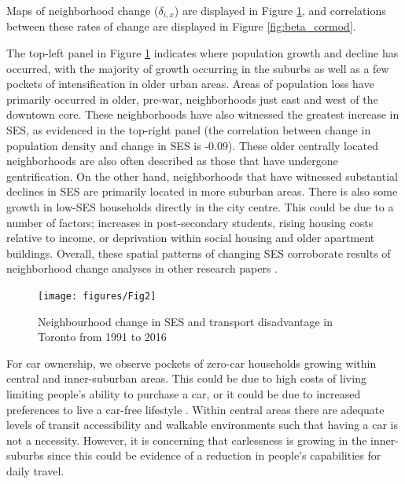 Maps of neighborhood change ($\delta_{i,x}$) are displayed in Figure \ref{fig:change_maps}, and correlations between these rates of change are displayed in Figure \ref{fig:beta_cormod}. 

The top-left panel in Figure \ref{fig:change_maps} indicates where population growth and decline has occurred, with the majority of growth occurring in the suburbs as well as a few pockets of intensification in older urban areas. Areas of population loss have primarily occurred in older, pre-war, neighborhoods just east and west of the downtown core. These neighborhoods have also witnessed the greatest increase in SES, as evidenced in the top-right panel (the correlation between change in population density and change in SES is -0.09). These older centrally located neighborhoods are also often described as those that have undergone gentrification. On the other hand, neighborhoods that have witnessed substantial declines in SES are primarily located in more suburban areas. There is also some growth in low-SES households directly in the city centre. This could be due to a number of factors; increases in post-secondary students, rising housing costs relative to income, or deprivation within social housing and older apartment buildings. Overall, these spatial patterns of changing SES corroborate results of neighborhood change analyses in other research papers \cite{ades_are_2012,breau_pulling_2018,hulchanski_three_2010,pavlic_declining_2014}. 


\begin{figure}[H]
	\centering
	\vspace{-0.2in}
	\hspace*{-0.333in}
	\texttt{[image: figures/Fig2]}
	\caption{{Neighbourhood change in SES and transport disadvantage in Toronto from 1991 to 2016}}
	\label{fig:change_maps}
	
\end{figure}


For car ownership, we observe pockets of zero-car households growing within central and inner-suburban areas. This could be due to high costs of living limiting people's ability to purchase a car, or it could be due to increased preferences to live a car-free lifestyle . Within central areas there are adequate levels of transit accessibility and walkable environments such that having a car is not a necessity. However, it is concerning that carlessness is growing in the inner-suburbs since this could be evidence of a reduction in people's capabilities for daily travel.

